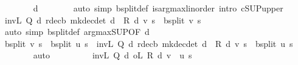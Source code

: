 \begin{isabellebody}
\ \ \ \ \ \ \isamarkupfalse%
\ d\isanewline
\ \ \ \ \ \ \isamarkupfalse%
\ {\isacharparenleft}{\kern0pt}auto\ simp{\isacharcolon}{\kern0pt}\ {\isasymL}\isactrlsub b{\isacharunderscore}{\kern0pt}split{\isacharunderscore}{\kern0pt}def{\isacharprime}{\kern0pt}\ is{\isacharunderscore}{\kern0pt}arg{\isacharunderscore}{\kern0pt}max{\isacharunderscore}{\kern0pt}linorder\ intro{\isacharbang}{\kern0pt}{\isacharcolon}{\kern0pt}\ cSUP{\isacharunderscore}{\kern0pt}upper{}{\isacharparenright}{\kern0pt}\isanewline
\ \ \ \ \isamarkupfalse%
\ {\isachardoublequoteopen}inv\isactrlsub L\ {\isacharparenleft}{\kern0pt}Q\ d{\isacharparenright}{\kern0pt}\ {\isacharparenleft}{\kern0pt}r{\isacharunderscore}{\kern0pt}dec\isactrlsub b\ {\isacharparenleft}{\kern0pt}mk{\isacharunderscore}{\kern0pt}dec{\isacharunderscore}{\kern0pt}det\ d{\isacharparenright}{\kern0pt}\ {\isacharplus}{\kern0pt}\ R\ d\ v{\isacharparenright}{\kern0pt}\ s\ {\isacharequal}{\kern0pt}\ {\isasymL}\isactrlsub b{\isacharunderscore}{\kern0pt}split\ v\ s{\isachardoublequoteclose}\isanewline
\ \ \ \ \ \ \isamarkupfalse%
\ {\isacharparenleft}{\kern0pt}auto\ simp{\isacharcolon}{\kern0pt}\ {\isasymL}\isactrlsub b{\isacharunderscore}{\kern0pt}split{\isacharunderscore}{\kern0pt}def{\isacharprime}{\kern0pt}\ arg{\isacharunderscore}{\kern0pt}max{\isacharunderscore}{\kern0pt}SUP{\isacharbrackleft}{\kern0pt}OF\ d{\isacharbrackright}{\kern0pt}{\isacharparenright}{\kern0pt}\isanewline
\ \ \ \ \isamarkupfalse%
\ {\isachardoublequoteopen}{\isasymL}\isactrlsub b{\isacharunderscore}{\kern0pt}split\ v\ s\ {\isacharminus}{\kern0pt}\ {\isasymL}\isactrlsub b{\isacharunderscore}{\kern0pt}split\ u\ s\ {\isacharequal}{\kern0pt}\ inv\isactrlsub L\ {\isacharparenleft}{\kern0pt}Q\ d{\isacharparenright}{\kern0pt}\ {\isacharparenleft}{\kern0pt}r{\isacharunderscore}{\kern0pt}dec\isactrlsub b\ {\isacharparenleft}{\kern0pt}mk{\isacharunderscore}{\kern0pt}dec{\isacharunderscore}{\kern0pt}det\ d{\isacharparenright}{\kern0pt}\ {\isacharplus}{\kern0pt}\ R\ d\ v{\isacharparenright}{\kern0pt}\ s\ {\isacharminus}{\kern0pt}\ {\isasymL}\isactrlsub b{\isacharunderscore}{\kern0pt}split\ u\ s{\isachardoublequoteclose}\isanewline
\ \ \ \ \ \ \isamarkupfalse%
\ auto\isanewline
\ \ \ \ \isamarkupfalse%
\ \isamarkupfalse%
\ {\isachardoublequoteopen}{\isasymdots}\ {\isasymle}\ {\isacharparenleft}{\kern0pt}inv\isactrlsub L\ {\isacharparenleft}{\kern0pt}Q\ d{\isacharparenright}{\kern0pt}\ o\isactrlsub L\ R\ d{\isacharparenright}{\kern0pt}\ {\isacharparenleft}{\kern0pt}v\ {\isacharminus}{\kern0pt}\ u{\isacharparenright}{\kern0pt}\ s{\isachardoublequoteclose}\isanewline

\end{isabellebody}

